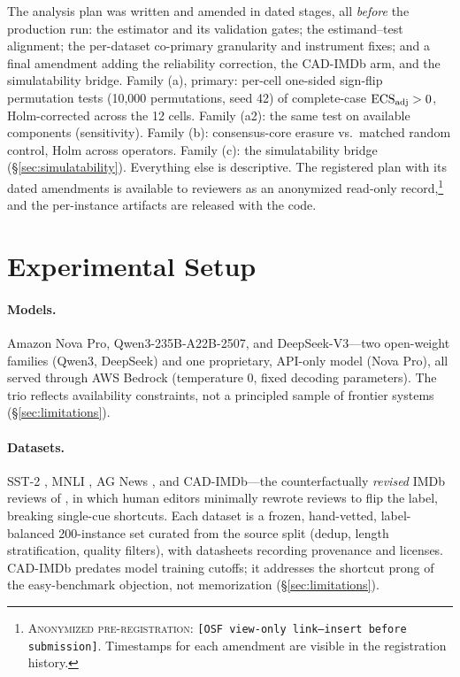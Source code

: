 \documentclass[11pt]{article}
\newcommand{\ecsadj}{\mbox{ECS\textsubscript{adj}}}
\begin{document}
The analysis plan was written and amended in dated stages, all \emph{before} the production run: the estimator and its validation gates; the estimand--test alignment; the per-dataset co-primary granularity and instrument fixes; and a final amendment adding the reliability correction, the CAD-IMDb arm, and the simulatability bridge. Family (a), primary: per-cell one-sided sign-flip permutation tests (10{,}000 permutations, seed 42) of complete-case $\ecsadj>0$, Holm-corrected \citep{holm1979simple} across the 12 cells. Family (a2): the same test on available components (sensitivity). Family (b): consensus-core erasure vs.\ matched random control, Holm across operators. Family (c): the simulatability bridge (\S\ref{sec:simulatability}). Everything else is descriptive. The registered plan with its dated amendments is available to reviewers as an anonymized read-only record,\footnote{\textsc{Anonymized pre-registration:} \texttt{[OSF view-only link---insert before submission]}. Timestamps for each amendment are visible in the registration history.} and the per-instance artifacts are released with the code.

\section{Experimental Setup}
\label{sec:setup}

\paragraph{Models.} Amazon Nova Pro, Qwen3-235B-A22B-2507, and DeepSeek-V3---two open-weight families (Qwen3, DeepSeek) and one proprietary, API-only model (Nova Pro), all served through AWS Bedrock (temperature 0, fixed decoding parameters). The trio reflects availability constraints, not a principled sample of frontier systems (\S\ref{sec:limitations}).

\paragraph{Datasets.} SST-2 \citep{socher2013recursive}, MNLI \citep{williams2018broad}, AG News \citep{zhang2015character}, and CAD-IMDb---the counterfactually \emph{revised} IMDb reviews of \citet{kaushik2020learning}, in which human editors minimally rewrote reviews to flip the label, breaking single-cue shortcuts. Each dataset is a frozen, hand-vetted, label-balanced 200-instance set curated from the source split (dedup, length stratification, quality filters), with datasheets recording provenance and licenses. CAD-IMDb predates model training cutoffs; it addresses the shortcut prong of the easy-benchmark objection, not memorization (\S\ref{sec:limitations}).
\end{document}
